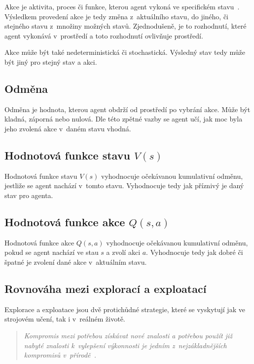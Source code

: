 Akce je aktivita, proces či funkce, kterou agent vykoná ve specifickém stavu~\cite{ActionCo67}.
Výsledkem provedení akce je tedy změna z~aktuálního stavu, do jiného, či stejného stavu z~množiny možných stavů.
Zjednodušeně, je to rozhodnutí, které agent vykonává v~prostředí a toto rozhodnutí ovlivňuje prostředí.

Akce může být také nedeterministická či stochastická.
Výsledný stav tedy může být jiný pro stejný stav a akci.
  
\subsection{Odměna}\label{subsec:odmena}

  Odměna je hodnota, kterou agent obdrží od prostředí po vybrání akce.
  Může být kladná, záporná nebo nulová.
  Dle této zpětné vazby se agent učí, jak moc byla jeho zvolená akce v~daném stavu vhodná.

\subsection{Hodnotová funkce stavu $V(s)$}

Hodnotová funkce stavu \emph{$V(s)$} vyhodnocuje očekávanou kumulativní odměnu, jestliže se agent nachází v~tomto stavu.
Vyhodnocuje tedy jak příznivý je daný stav pro agenta.

\subsection{Hodnotová funkce akce $Q(s, a)$}
\label{subsubsec:q_function}

Hodnotová funkce akce \emph{$Q(s, a)$} vyhodnocuje očekávanou kumulativní odměnu, pokud se agent nachází ve stau $s$ a zvolí akci $a$.
Vyhodnocuje tedy jak dobré či špatné je zvolení dané akce v~aktuálním stavu.


\subsection{Rovnováha mezi explorací a exploatací}
\label{subsec:exploration-exploitation-dillemma}
Explorace a exploatace jsou dvě protichůdné strategie, které se vyskytují jak ve strojovém učení, tak i v~reálném životě.
\begin{quote}
  \emph{Kompromis mezi potřebou získávat nové znalosti a potřebou použít již nabyté znalosti k~vylepšení výkonnosti je jedním z~nejzákladnějších kompromisů v~přírodě~\cite{Exploitation_Exploration}.}
\end{quote}


